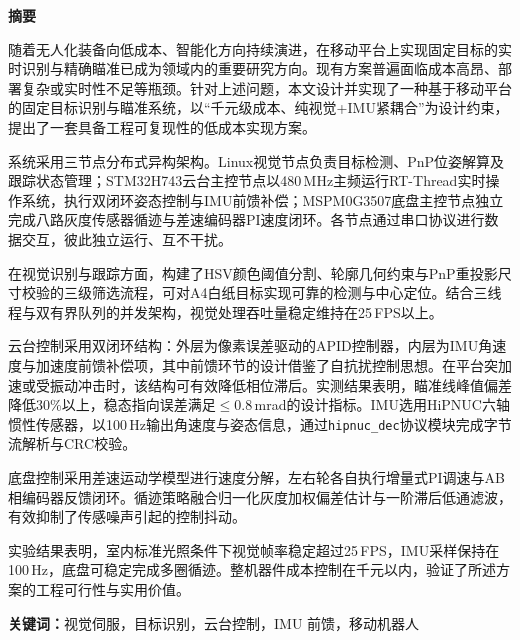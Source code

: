 

\begin{center}\heiti\sanhao\textbf{
        摘要
    }
\end{center}

随着无人化装备向低成本、智能化方向持续演进，在移动平台上实现固定目标的实时识别与精确瞄准已成为领域内的重要研究方向。现有方案普遍面临成本高昂、部署复杂或实时性不足等瓶颈。针对上述问题，本文设计并实现了一种基于移动平台的固定目标识别与瞄准系统，以``千元级成本、纯视觉+IMU紧耦合''为设计约束，提出了一套具备工程可复现性的低成本实现方案。

系统采用三节点分布式异构架构。Linux视觉节点负责目标检测、PnP位姿解算及跟踪状态管理；STM32H743云台主控节点以480\,MHz主频运行RT-Thread实时操作系统，执行双闭环姿态控制与IMU前馈补偿；MSPM0G3507底盘主控节点独立完成八路灰度传感器循迹与差速编码器PI速度闭环。各节点通过串口协议进行数据交互，彼此独立运行、互不干扰。

在视觉识别与跟踪方面，构建了HSV颜色阈值分割、轮廓几何约束与PnP重投影尺寸校验的三级筛选流程，可对A4白纸目标实现可靠的检测与中心定位。结合三线程与双有界队列的并发架构，视觉处理吞吐量稳定维持在25\,FPS以上。

云台控制采用双闭环结构：外层为像素误差驱动的APID控制器，内层为IMU角速度与加速度前馈补偿项，其中前馈环节的设计借鉴了自抗扰控制思想。在平台突加速或受振动冲击时，该结构可有效降低相位滞后。实测结果表明，瞄准线峰值偏差降低30\%以上，稳态指向误差满足$\leq$0.8\,mrad的设计指标。IMU选用HiPNUC六轴惯性传感器，以100\,Hz输出角速度与姿态信息，通过\texttt{hipnuc\_dec}协议模块完成字节流解析与CRC校验。

底盘控制采用差速运动学模型进行速度分解，左右轮各自执行增量式PI调速与AB相编码器反馈闭环。循迹策略融合归一化灰度加权偏差估计与一阶滞后低通滤波，有效抑制了传感噪声引起的控制抖动。

实验结果表明，室内标准光照条件下视觉帧率稳定超过25\,FPS，IMU采样保持在100\,Hz，底盘可稳定完成多圈循迹。整机器件成本控制在千元以内，验证了所述方案的工程可行性与实用价值。

\textbf{关键词：}视觉伺服，目标识别，云台控制，IMU 前馈，移动机器人

\clearpage